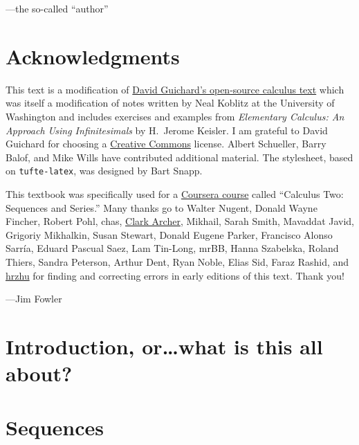 \documentclass[justified]{tufte-book}
\begin{document}
\vspace{0.5in}
\hfill---the so-called ``author''

\chapter*{Acknowledgments}

This text is a modification of
\href{http://www.whitman.edu/mathematics/calculus/}{David Guichard's
  open-source calculus text} which was itself a modification of notes
written by Neal Koblitz at the University of Washington and includes
exercises and examples from {\it Elementary Calculus: An Approach
  Using Infinitesimals} by H.~Jerome Keisler.  I am grateful to David
Guichard for choosing a
\href{http://creativecommons.org/licenses/by-nc-sa/3.0/}{Creative
  Commons} license.  Albert Schueller, Barry Balof, and Mike Wills
have contributed additional material.  The stylesheet, based on \texttt{tufte-latex}, was designed by Bart Snapp.

This textbook was specifically used for a
\href{https://www.coursera.org/course/sequence}{Coursera course}
called ``Calculus Two: Sequences and Series.''  Many thanks go to
Walter Nugent, Donald Wayne Fincher, Robert Pohl, chas,
\href{https://github.com/clark-archer}{Clark Archer}, Mikhail, Sarah Smith,
Mavaddat Javid, Grigoriy Mikhalkin, Susan Stewart, Donald Eugene Parker, Francisco Alonso Sarr\'ia, Eduard Pascual Saez, Lam Tin-Long, mrBB, Hanna
Szabelska, Roland Thiers, Sandra Peterson, Arthur Dent, Ryan Noble, Elias Sid, Faraz Rashid, and
\href{https://github.com/hrzhu}{hrzhu} for finding and correcting
errors in early editions of this text.  Thank you!

\vspace{0.5in}
\hfill---Jim Fowler

\mainmatter

\chapter*{Introduction, or\ldots what is this all about?}



\chapter{Sequences}
\label{chapter:sequences}
\end{document}
